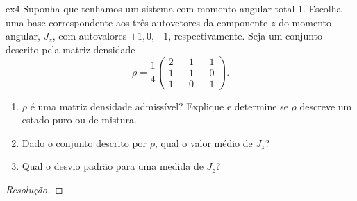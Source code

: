 \begin{exercício}{}{ex4}
    Suponha que tenhamos um sistema com momento angular total 1. Escolha uma base correspondente aos três autovetores da componente \(z\) do momento angular, \(J_z\), com autovalores \(+1, 0, -1\), respectivamente. Seja um conjunto descrito pela matriz densidade
    \begin{equation*}
        \rho = \frac14 \begin{pmatrix}
           2 && 1 && 1\\
           1 && 1 && 0\\
           1 && 0 && 1
        \end{pmatrix}.
    \end{equation*}
    \begin{enumerate}[label=(\alph*)]
        \item \(\rho\) é uma matriz densidade admissível? Explique e determine se \(\rho\) descreve um estado puro ou de mistura.
        \item Dado o conjunto descrito por \(\rho\), qual o valor médio de \(J_z\)?
        \item Qual o desvio padrão para uma medida de \(J_z\)?
    \end{enumerate}
\end{exercício}
\begin{proof}[Resolução]
    
\end{proof}
